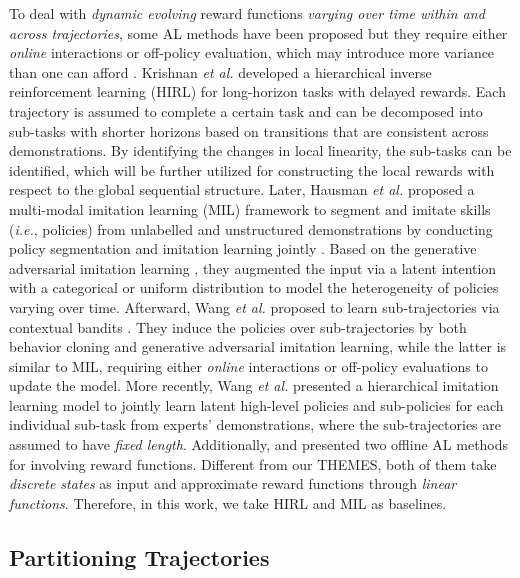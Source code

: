\documentclass{article}
\begin{document}
To deal with \emph{dynamic evolving} reward functions \emph{varying over time within and across trajectories}, some AL methods have been proposed but they require either \emph{online} interactions or off-policy evaluation, which may introduce more variance than one can afford \cite{jarrett2020strictly}. Krishnan \textit{et al.} developed a hierarchical inverse reinforcement learning (HIRL) \cite{krishnan2016hirl} for long-horizon tasks with delayed rewards. Each trajectory is assumed to complete a certain task and can be decomposed into sub-tasks with shorter horizons based on transitions that are consistent across demonstrations. By identifying the changes in local linearity, the sub-tasks can be identified, which will be further utilized for constructing the local rewards with respect to the global sequential structure.
Later, Hausman \textit{et al.} proposed a multi-modal imitation learning (MIL) framework to segment and imitate skills (\textit{i.e.}, policies) from unlabelled and unstructured demonstrations by conducting policy segmentation and imitation learning jointly \cite{hausman2017multi}. Based on the generative adversarial imitation learning \cite{ho2016generative}, they augmented the input via a latent intention with a categorical or uniform distribution to model the heterogeneity of policies varying over time.
Afterward, Wang \textit{et al.} proposed to learn sub-trajectories via contextual bandits \cite{wang2020multi}. They induce the policies over sub-trajectories by both behavior cloning and generative adversarial imitation learning, while the latter is similar to MIL, requiring either \emph{online} interactions or off-policy evaluations to update the model. More recently, Wang \textit{et al.} presented a hierarchical imitation learning model \cite{wang2022hierarchical} to jointly learn latent high-level policies and sub-policies for each individual sub-task from experts' demonstrations, where the sub-trajectories are assumed to have \emph{fixed length}. Additionally, \cite{nguyen2015inverse} and \cite{ashwood2022dynamic} presented two offline AL methods for involving reward functions. Different from our THEMES, both of them take \emph{discrete states} as input and approximate reward functions through \emph{linear functions}. Therefore, in this work, we take HIRL \cite{krishnan2016hirl} and MIL \cite{hausman2017multi} as baselines.

 

\subsection{Partitioning Trajectories}
\end{document}
